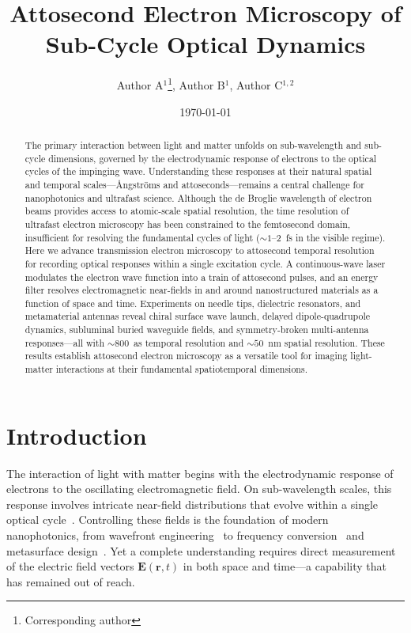 \documentclass[12pt]{article}
\title{Attosecond Electron Microscopy of Sub-Cycle Optical Dynamics}
\author{
    Author A$^{1}$\thanks{Corresponding author},
    Author B$^{1}$,
    Author C$^{1,2}$
}
\date{\today}
\begin{document}
\maketitle

\begin{abstract}
\noindent
The primary interaction between light and matter unfolds on sub-wavelength and sub-cycle dimensions, governed by the electrodynamic response of electrons to the optical cycles of the impinging wave. Understanding these responses at their natural spatial and temporal scales---\AA{}ngstr\"{o}ms and attoseconds---remains a central challenge for nanophotonics and ultrafast science. Although the de Broglie wavelength of electron beams provides access to atomic-scale spatial resolution, the time resolution of ultrafast electron microscopy has been constrained to the femtosecond domain, insufficient for resolving the fundamental cycles of light (${\sim}1$--2~fs in the visible regime). Here we advance transmission electron microscopy to attosecond temporal resolution for recording optical responses within a single excitation cycle. A continuous-wave laser modulates the electron wave function into a train of attosecond pulses, and an energy filter resolves electromagnetic near-fields in and around nanostructured materials as a function of space and time. Experiments on needle tips, dielectric resonators, and metamaterial antennas reveal chiral surface wave launch, delayed dipole-quadrupole dynamics, subluminal buried waveguide fields, and symmetry-broken multi-antenna responses---all with ${\sim}800$~as temporal resolution and ${\sim}50$~nm spatial resolution. These results establish attosecond electron microscopy as a versatile tool for imaging light-matter interactions at their fundamental spatiotemporal dimensions.
\end{abstract}

\section{Introduction}
\label{sec:introduction}

The interaction of light with matter begins with the electrodynamic response of electrons to the oscillating electromagnetic field. On sub-wavelength scales, this response involves intricate near-field distributions that evolve within a single optical cycle~\cite{Fei2012,Grinblat2021,Shaltout2019}. Controlling these fields is the foundation of modern nanophotonics, from wavefront engineering~\cite{Khorasaninejad2017,Kamali2018} to frequency conversion~\cite{Li2020_nl} and metasurface design~\cite{Yu2014}. Yet a complete understanding requires direct measurement of the electric field vectors $\mathbf{E}(\mathbf{r}, t)$ in both space and time---a capability that has remained out of reach.
\end{document}

